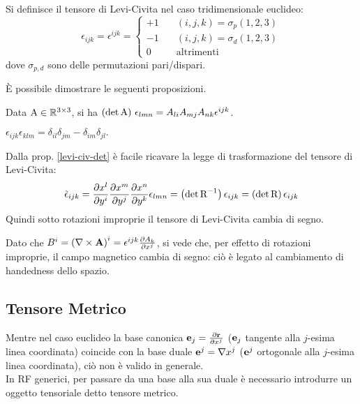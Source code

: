 \begin{definition}
	Si definisce il tensore di Levi-Civita nel caso tridimensionale euclideo:
	\begin{equation}
		\epsilon_{ijk} = \epsilon^{ijk} = 
		\begin{cases}
			+1 &\quad (i,j,k) = \sigma_p(1,2,3) \\
			-1 &\quad (i,j,k) = \sigma_d(1,2,3) \\
			0  &\quad \text{altrimenti}
		\end{cases}
		\label{eq:10}
	\end{equation}
	dove $ \sigma_{p,d} $ sono delle permutazioni pari/dispari.
\end{definition}

È possibile dimostrare le seguenti proposizioni.

\begin{proposition}\label{levi-civ-det}
	Data $ \mathbf{\text{A}} \in \mathbb{R}^{3\times 3} $, si ha $ \left(\det\mathbf{\text{A}}\right)\, \epsilon_{lmn} = A_{li} A_{mj} A_{nk} \epsilon^{ijk} $.
\end{proposition}

\begin{proposition}
	$ \epsilon_{ijk}\epsilon_{klm} = \delta_{il}\delta_{jm} - \delta_{im}\delta_{jl}.$
\end{proposition}

Dalla prop. \ref{levi-civ-det} è facile ricavare la legge di trasformazione del tensore di Levi-Civita:
\begin{equation}
	\tilde{\epsilon}_{ijk} = \frac{\partial x^l}{\partial y^i} \frac{\partial x^m}{\partial y^j} \frac{\partial x^n}{\partial y^k} \epsilon_{lmn} = \left(\det\mathbf{\text{R}}^{-1}\right) \epsilon_{ijk} = \left(\det\mathbf{\text{R}}\right) \epsilon_{ijk}
	\label{eq:11}
\end{equation}
Quindi sotto rotazioni improprie il tensore di Levi-Civita cambia di segno.

\begin{example}
	Dato che $ B^i = \left(\nabla\times\mathbf{A}\right)^i = \epsilon^{ijk}\frac{\partial A_k}{\partial x^j}$, si vede che, per effetto di rotazioni improprie, il campo magnetico cambia di segno: ciò è legato al cambiamento di handedness dello spazio.
\end{example}


\subsection{Tensore Metrico}


Mentre nel caso euclideo la base canonica $ \mathbf{e}_j = \frac{\partial \mathbf{r}}{\partial x^j} $ ($ \mathbf{e}_j $ tangente alla $ j $-esima linea coordinata) coincide con la base duale $ \mathbf{e}^j = \nabla x^j $ ($ \mathbf{e}^j $ ortogonale alla $ j $-esima linea coordinata), ciò non è valido in generale.\\
In RF generici, per passare da una base alla sua duale è necessario introdurre un oggetto tensoriale detto tensore metrico.

